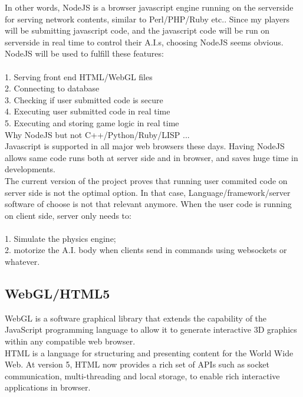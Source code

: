 \documentclass[12pt]{article}
\begin{document}
In other words, NodeJS is a browser javascript engine running on the serverside for serving network contents, similar to Perl/PHP/Ruby etc.. Since my players will be submitting javascript code, and the javascript code will be run on serverside in real time to control their A.I.s, choosing NodeJS seems obvious. NodeJS will be used to fulfill these features:\\
\\
1. Serving front end HTML/WebGL files\\
2. Connecting to database\\
3. Checking if user submitted code is secure\\
4. Executing user submitted code in real time\\
5. Executing and storing game logic in real time\\

Why NodeJS but not C++/Python/Ruby/LISP ... \\
Javascript is supported in all major web browsers these days. Having NodeJS allows same code runs both at server side and in browser, and saves huge time in developments.\\

{\color{red}
The current version of the project proves that running user commited code on server side is not the optimal option. In that case, Language/framework/server software of choose is not that relevant anymore. When the user code is running on client side, server only needs to:\\
\\
1. Simulate the physics engine;\\
2. motorize the A.I. body when clients send in commands using websockets or whatever.\\
}

\subsection{WebGL/HTML5}
WebGL is a software graphical library that extends the capability of the JavaScript programming language to allow it to generate interactive 3D graphics within any compatible web browser. \\

HTML is a language for structuring and presenting content for the World Wide Web. At version 5, HTML now provides a rich set of APIs such as socket communication, multi-threading and local storage, to enable rich interactive applications in browser.\\
\end{document}
